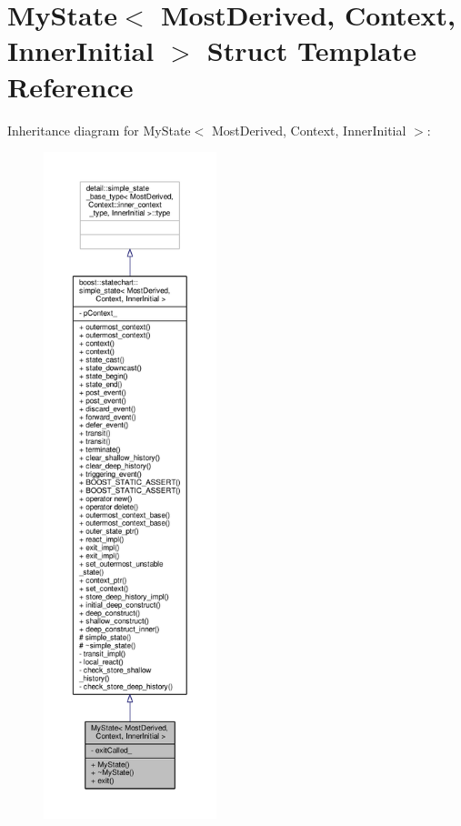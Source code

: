 \hypertarget{struct_my_state}{}\section{My\+State$<$ Most\+Derived, Context, Inner\+Initial $>$ Struct Template Reference}
\label{struct_my_state}


Inheritance diagram for My\+State$<$ Most\+Derived, Context, Inner\+Initial $>$\+:
\nopagebreak
\begin{figure}[H]
\begin{center}
\leavevmode
\includegraphics[height=550pt]{struct_my_state__inherit__graph}
\end{center}
\end{figure}


